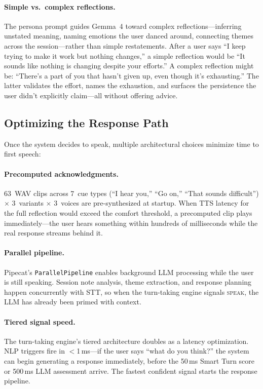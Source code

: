\documentclass{article}
\begin{document}
\paragraph{Simple vs.\ complex reflections.} The persona prompt guides Gemma~4 toward complex reflections---inferring unstated meaning, naming emotions the user danced around, connecting themes across the session---rather than simple restatements. After a user says ``I keep trying to make it work but nothing changes,'' a simple reflection would be ``It sounds like nothing is changing despite your efforts.'' A complex reflection might be: ``There's a part of you that hasn't given up, even though it's exhausting.'' The latter validates the effort, names the exhaustion, and surfaces the persistence the user didn't explicitly claim---all without offering advice.

\subsection{Optimizing the Response Path}

Once the system decides to speak, multiple architectural choices minimize time to first speech:

\paragraph{Precomputed acknowledgments.} 63~WAV clips across 7~cue types (``I hear you,'' ``Go on,'' ``That sounds difficult'') $\times$ 3~variants $\times$ 3~voices are pre-synthesized at startup. When TTS latency for the full reflection would exceed the comfort threshold, a precomputed clip plays immediately---the user hears something within hundreds of milliseconds while the real response streams behind it.

\paragraph{Parallel pipeline.} Pipecat's \texttt{ParallelPipeline} enables background LLM processing while the user is still speaking. Session note analysis, theme extraction, and response planning happen concurrently with STT, so when the turn-taking engine signals \textsc{speak}, the LLM has already been primed with context.

\paragraph{Tiered signal speed.} The turn-taking engine's tiered architecture doubles as a latency optimization. NLP triggers fire in $<$1\,ms---if the user says ``what do you think?'' the system can begin generating a response immediately, before the 50\,ms Smart Turn score or 500\,ms LLM assessment arrive. The fastest confident signal starts the response pipeline.
\end{document}

